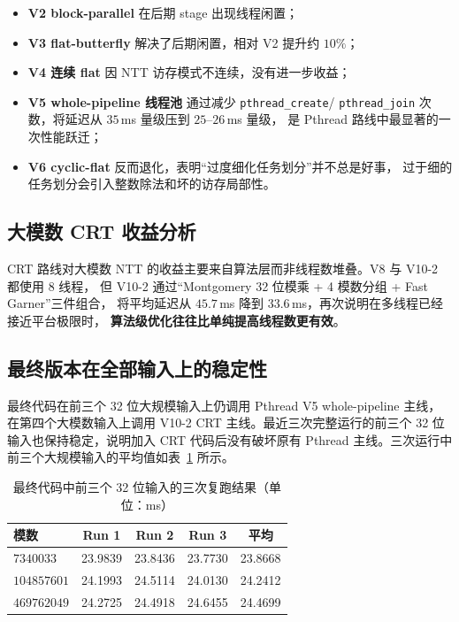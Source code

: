\documentclass[UTF8,a4paper,10pt]{ctexart}
\begin{document}
\begin{itemize}
  \item \textbf{V2 block-parallel} 在后期 stage 出现线程闲置；
  \item \textbf{V3 flat-butterfly} 解决了后期闲置，相对 V2 提升约 $10\%$；
  \item \textbf{V4 连续 flat} 因 NTT 访存模式不连续，没有进一步收益；
  \item \textbf{V5 whole-pipeline 线程池} 通过减少 \texttt{pthread\_create}/
        \texttt{pthread\_join} 次数，将延迟从 $35$\,ms 量级压到 $25$--$26$\,ms 量级，
        是 Pthread 路线中最显著的一次性能跃迁；
  \item \textbf{V6 cyclic-flat} 反而退化，表明``过度细化任务划分''并不总是好事，
        过于细的任务划分会引入整数除法和坏的访存局部性。
\end{itemize}

\subsection{大模数 CRT 收益分析}

CRT 路线对大模数 NTT 的收益主要来自算法层而非线程数堆叠。V8 与 V10-2 都使用 8 线程，
但 V10-2 通过``Montgomery 32 位模乘 + 4 模数分组 + Fast Garner''三件组合，
将平均延迟从 $45.7$\,ms 降到 $33.6$\,ms，再次说明在多线程已经接近平台极限时，
\textbf{算法级优化往往比单纯提高线程数更有效}。


\subsection{最终版本在全部输入上的稳定性}

最终代码在前三个 32 位大规模输入上仍调用 Pthread V5 whole-pipeline 主线，在第四个大模数输入上调用
V10-2 CRT 主线。最近三次完整运行的前三个 32 位输入也保持稳定，说明加入 CRT 代码后没有破坏原有
Pthread 主线。三次运行中前三个大规模输入的平均值如表~\ref{tab:final-three-runs-32bit} 所示。

\begin{table}[H]
  \centering
  \begin{tabular}{lcccc}
  \toprule
  \textbf{模数} & \textbf{Run 1} & \textbf{Run 2} & \textbf{Run 3} & \textbf{平均}\\
  \midrule
  $7340033$   & 23.9839 & 23.8436 & 23.7730 & 23.8668\\
  $104857601$ & 24.1993 & 24.5114 & 24.0130 & 24.2412\\
  $469762049$ & 24.2725 & 24.4918 & 24.6455 & 24.4699\\
  \bottomrule
  \end{tabular}
  \caption{最终代码中前三个 32 位输入的三次复跑结果（单位：ms）}
  \label{tab:final-three-runs-32bit}
\end{table}
\end{document}
